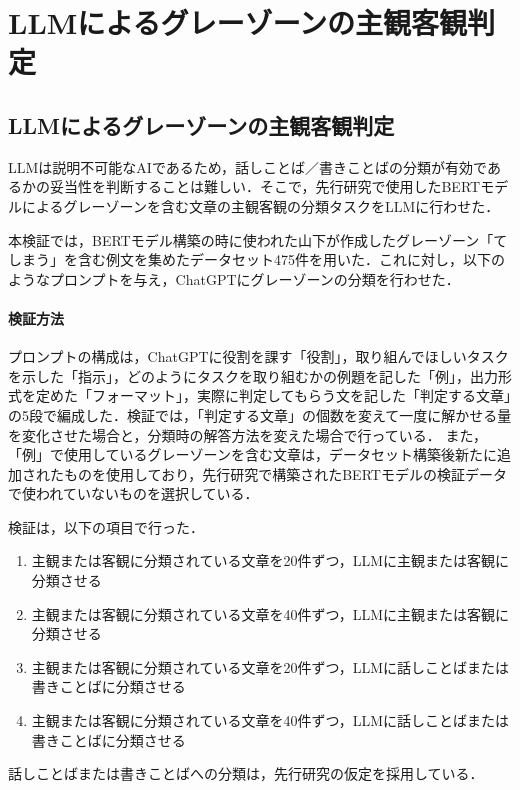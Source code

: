 \chapter{LLMによるグレーゾーンの主観客観判定 \label{c6}}

\section{LLMによるグレーゾーンの主観客観判定 \label{c6s2}}
LLMは説明不可能なAIであるため，話しことば／書きことばの分類が有効であるかの妥当性を判断することは難しい．そこで，先行研究で使用したBERTモデルによるグレーゾーンを含む文章の主観客観の分類タスクをLLMに行わせた．

本検証では，BERTモデル構築の時に使われた山下が作成したグレーゾーン「てしまう」を含む例文を集めたデータセット475件を用いた．これに対し，以下のようなプロンプトを与え，ChatGPTにグレーゾーンの分類を行わせた．



\subsubsection{検証方法}
プロンプトの構成は，ChatGPTに役割を課す「役割」，取り組んでほしいタスクを示した「指示」，どのようにタスクを取り組むかの例題を記した「例」，出力形式を定めた「フォーマット」，実際に判定してもらう文を記した「判定する文章」の5段で編成した．検証では，「判定する文章」の個数を変えて一度に解かせる量を変化させた場合と，分類時の解答方法を変えた場合で行っている．
また，「例」で使用しているグレーゾーンを含む文章は，データセット構築後新たに追加されたものを使用しており，先行研究\cite{ai-checker}で構築されたBERTモデルの検証データで使われていないものを選択している．


検証は，以下の項目で行った．
\begin{enumerate}
    \item 主観または客観に分類されている文章を20件ずつ，LLMに主観または客観に分類させる
    \item 主観または客観に分類されている文章を40件ずつ，LLMに主観または客観に分類させる
    \item 主観または客観に分類されている文章を20件ずつ，LLMに話しことばまたは書きことばに分類させる
    \item 主観または客観に分類されている文章を40件ずつ，LLMに話しことばまたは書きことばに分類させる
\end{enumerate}
話しことばまたは書きことばへの分類は，先行研究\cite{checker}の仮定を採用している．

